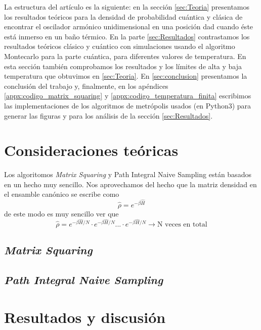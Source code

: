 \documentclass[%
 reprint,
 amsmath,amssymb,
 aps,
 pra,
]{revtex4-2}
\begin{document}
La estructura del artículo es la siguiente: en la sección \ref{sec:Teoria} presentamos los resultados teóricos para la densidad de probabilidad cuántica y clásica de encontrar el oscilador armónico unidimensional en una posición dad cuando éste está inmerso en un baño térmico. En la parte \ref{sec:Resultados} contrastamos los resultados teóricos clásico y cuántico con simulaciones usando el algoritmo Montecarlo para la parte cuántica, para diferentes valores de temperatura. En esta sección también comprobamos los resultados y los límites de alta y baja temperatura que obtuvimos en \ref{sec:Teoria}. En \ref{sec:conclusion} presentamos la conclusión del trabajo y, finalmente, en los apéndices \ref{appx:codigo_matrix_squaring} y \ref{appx:codigo_temperatura_finita} escribimos las implementaciones de los algoritmos de metrópolis usados (en Python3) para generar las figuras y para los análisis de la sección \ref{sec:Resultados}.


\section{\label{sec:Teoria}Consideraciones teóricas}

Los algoritomos \textit{Matrix Squaring} y Path Integral Naive Sampling están basados en un hecho muy sencillo. Nos aprovechamos del hecho que la matriz densidad en el ensamble canónico se escribe como 
\begin{equation}
	\hat{\rho} = e^{-\beta \hat{H}}
\end{equation}
de este modo es muy sencillo ver que
\begin{equation}
	\hat{\rho} = e^{-\beta\hat{H}/N} \cdot e^{-\beta\hat{H}/N} ... \cdot e^{-\beta\hat{H}/N} \rightarrow \text{N veces en total}
\end{equation}

\subsection{\textit{Matrix Squaring}\label{subsec:MtxSq}}



\subsection{\textit{Path Integral Naive Sampling}\label{subsec:PathInt}} 


\section{\label{sec:Resultados}Resultados y discusión}
\end{document}

